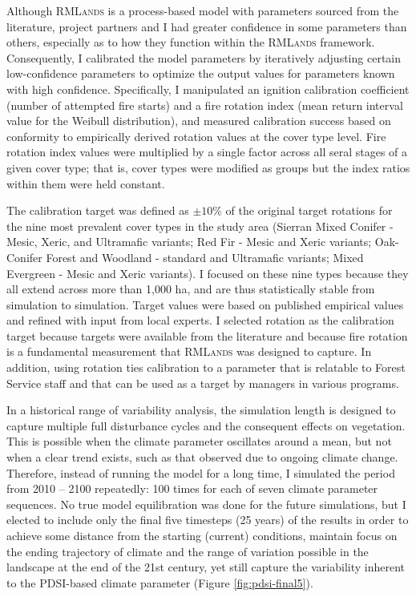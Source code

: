 Although \textsc{RMLands} is a process-based model with parameters sourced from the literature, project partners and I had greater confidence in some parameters than others, especially as to how they function within the \textsc{RMLands} framework. Consequently, I calibrated the model parameters by iteratively adjusting certain low-confidence parameters to optimize the output values for parameters known with high confidence. Specifically, I manipulated an ignition calibration coefficient (number of attempted fire starts) and a fire rotation index (mean return interval value for the Weibull distribution), and measured calibration success based on conformity to empirically derived rotation values at the cover type level. Fire rotation index values were multiplied by a single factor across all seral stages of a given cover type; that is, cover types were modified as groups but the index ratios within them were held constant.

The calibration target was defined as $\pm 10$\% of the original target rotations for the nine most prevalent cover types in the study area (Sierran Mixed Conifer - Mesic, Xeric, and Ultramafic variants; Red Fir - Mesic and Xeric variants; Oak-Conifer Forest and Woodland - standard and Ultramafic variants; Mixed Evergreen - Mesic and Xeric variants). I focused on these nine types because they all extend across more than 1,000 ha, and are thus statistically stable from simulation to simulation. Target values were based on published empirical values and refined with input from local experts. I selected rotation as the calibration target because targets were available from the literature and because fire rotation is a fundamental measurement that \textsc{RMLands} was designed to capture. In addition, using rotation ties calibration to a parameter that is relatable to Forest Service staff and that can be used as a target by managers in various programs.

In a historical range of variability analysis, the simulation length is designed to capture multiple full disturbance cycles and the consequent effects on vegetation. This is possible when the climate parameter oscillates around a mean, but not when a clear trend exists, such as that observed due to ongoing climate change. Therefore, instead of running the model for a long time, I simulated the period from 2010 -- 2100 repeatedly: 100 times for each of seven climate parameter sequences. No true model equilibration was done for the future simulations, but I elected to include only the final five timesteps (25 years) of the results in order to achieve some distance from the starting (current) conditions, maintain focus on the ending trajectory of climate and the range of variation possible in the landscape at the end of the 21st century, yet still capture the variability inherent to the PDSI-based climate parameter (Figure \ref{fig:pdsi-final5}).



